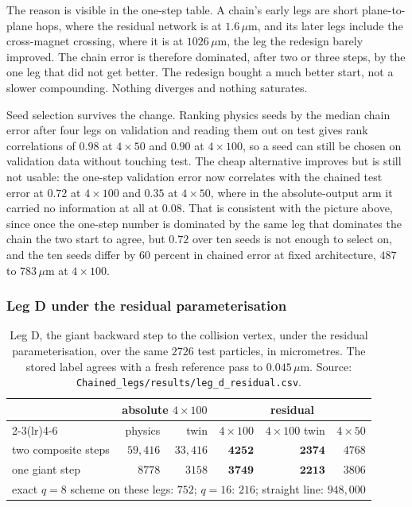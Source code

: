 \documentclass[11pt,a4paper]{article}
\newcommand{\um}{\ensuremath{\,\mu\mathrm{m}}}
\begin{document}
The reason is visible in the one-step table. A chain's early legs are short
plane-to-plane hops, where the residual network is at $1.6\um$, and its later
legs include the cross-magnet crossing, where it is at $1026\um$, the leg the
redesign barely improved. The chain error is therefore dominated, after two or
three steps, by the one leg that did not get better. The redesign bought a much
better start, not a slower compounding. Nothing diverges and nothing saturates.

Seed selection survives the change. Ranking physics seeds by the median chain
error after four legs on validation and reading them out on test gives rank
correlations of $0.98$ at $4 \times 50$ and $0.90$ at $4 \times 100$, so a seed
can still be chosen on validation data without touching test. The cheap
alternative improves but is still not usable: the one-step validation error now
correlates with the chained test error at $0.72$ at $4 \times 100$ and $0.35$ at
$4 \times 50$, where in the absolute-output arm it carried no information at all
at $0.08$. That is consistent with the picture above, since once the one-step
number is dominated by the same leg that dominates the chain the two start to
agree, but $0.72$ over ten seeds is not enough to select on, and the ten seeds
differ by $60$ percent in chained error at fixed architecture, $487$ to $783\um$
at $4 \times 100$.

\subsubsection{Leg D under the residual parameterisation}

\begin{table}[tbp]
  \centering
  \caption{Leg D, the giant backward step to the collision vertex, under the
  residual parameterisation, over the same $2726$ test particles, in
  micrometres. The stored label agrees with a fresh reference pass to
  $0.045\um$. Source:
  \texttt{Chained\_legs/results/leg\_d\_residual.csv}.}
  \label{tab:legd-residual}
  \footnotesize
  \setlength{\tabcolsep}{3pt}
  \begin{tabular}{lrrrrr}
    \toprule
    & \multicolumn{2}{c}{absolute $4{\times}100$}
    & \multicolumn{3}{c}{residual} \\
    \cmidrule(lr){2-3}\cmidrule(lr){4-6}
    & physics & twin & $4{\times}100$ & $4{\times}100$ twin & $4{\times}50$ \\
    \midrule
    two composite steps & $59{,}416$ & $33{,}416$ & $\mathbf{4252}$ & $\mathbf{2374}$ & $4768$ \\
    one giant step      & $8778$     & $3158$     & $\mathbf{3749}$ & $\mathbf{2213}$ & $3806$ \\
    \midrule
    \multicolumn{6}{l}{exact $q = 8$ scheme on these legs: $752$; $q = 16$:
      $216$; straight line: $948{,}000$} \\
    \bottomrule
  \end{tabular}
\end{table}
\end{document}
